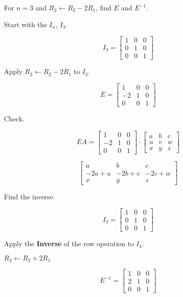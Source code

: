 \documentclass[12pt]{article}
\begin{document}
For $n=3$ and $R_2 \gets R_2 - 2R_1$, find $E$ and $E^{-1}$.

Start with the $I_n$, $I_3$.

\[
  I_3 =
  \begin{bmatrix}
    1 & 0 & 0 \\
    0 & 1 & 0 \\
    0 & 0 & 1
  \end{bmatrix}
\]

Apply $R_2 \gets R_2 - 2R_1$ to $I_3$.

\[
  E = 
  \begin{bmatrix}
    1 & 0 & 0 \\
    -2 & 1 & 0 \\
    0 & 0 & 1
  \end{bmatrix}
\]

Check.

\[
  EA =
  \begin{bmatrix}
    1 & 0 & 0 \\
    -2 & 1 & 0 \\
    0 & 0 & 1
  \end{bmatrix}
  \cdot
  \begin{bmatrix}
    a & b & c \\
    u & v & w \\
    x & y & z
  \end{bmatrix}
\]

\[
  \begin{bmatrix}
    a & b & c \\
    -2a+u & -2b+v & -2c+w \\
    x & y & z
  \end{bmatrix}
\]

Find the inverse.

\[
  I_3 =
  \begin{bmatrix}
    1 & 0 & 0 \\
    0 & 1 & 0 \\
    0 & 0 & 1
  \end{bmatrix}
\]

Apply the \textbf{Inverse} of the row operation to $I_3$.

$R_2 \gets R_2 + 2R_1$

\[
  E^{-1} =
  \begin{bmatrix}
    1 & 0 & 0 \\
    2 & 1 & 0 \\
    0 & 0 & 1
  \end{bmatrix}
\]

\end{document}
